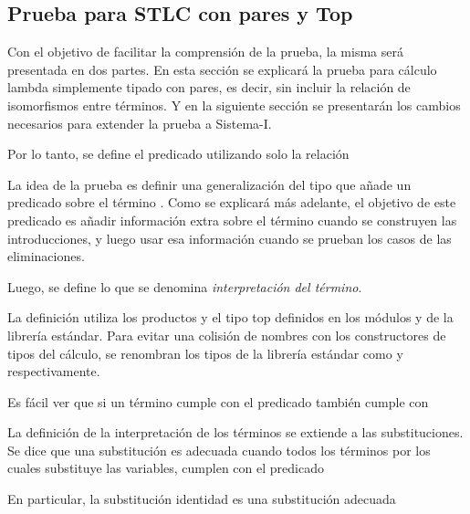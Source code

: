 \subsection{Prueba para STLC con pares y Top}

Con el objetivo de facilitar la comprensión de la prueba, la misma será presentada en dos partes.
En esta sección se explicará la prueba para cálculo lambda simplemente tipado con pares, es decir, sin incluir la relación de isomorfismos entre términos.
Y en la siguiente sección se presentarán los cambios necesarios para extender la prueba a Sistema-I.


Por lo tanto, se define el predicado  utilizando solo la relación \type{$\_\hookrightarrow\_$}


La idea de la prueba es definir una generalización del tipo  que añade un predicado sobre el término .
Como se explicará más adelante, el objetivo de este predicado es añadir información extra sobre el término cuando se construyen las introducciones, y luego usar esa información cuando se prueban los casos de las eliminaciones.


Luego, se define lo que se denomina \textit{interpretación del término}.


La definición utiliza los productos \func{$\_\times\_$} y el tipo top \type{$\top$} definidos en los módulos  y  de la librería estándar.
Para evitar una colisión de nombres con los constructores de tipos del cálculo, se renombran los tipos de la librería estándar como \func{$\_\otimes\_$} y  respectivamente.

Es fácil ver que si un término cumple con el predicado  también cumple con 


La definición de la interpretación de los términos se extiende a las substituciones.
Se dice que una substitución es adecuada cuando todos los términos por los cuales substituye las variables, cumplen con el predicado \snstar


En particular, la substitución identidad  es una substitución adecuada

